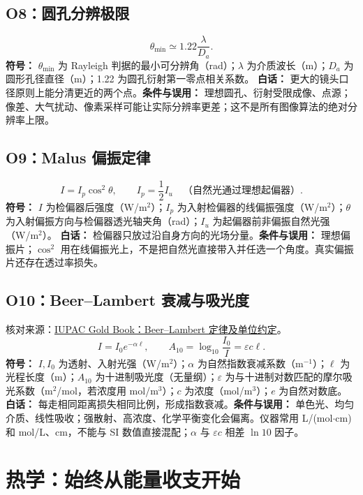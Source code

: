 \subsection{O8：圆孔分辨极限}
\begin{equation}
\theta_{\min}\simeq1.22\frac{\lambda}{D_a}.
\end{equation}
\textbf{符号：} $\theta_{\min}$ 为 Rayleigh 判据的最小可分辨角（rad）；$\lambda$ 为介质波长（m）；$D_a$ 为圆形孔径直径（m）；1.22 为圆孔衍射第一零点相关系数。
\textbf{白话：} 更大的镜头口径原则上能分清更近的两个点。\textbf{条件与误用：} 理想圆孔、衍射受限成像、点源；像差、大气扰动、像素采样可能让实际分辨率更差；这不是所有图像算法的绝对分辨率上限。

\subsection{O9：Malus 偏振定律}
\begin{equation}
I=I_p\cos^2\theta,\qquad I_p=\frac12I_u\quad\text{（自然光通过理想起偏器）}.
\end{equation}
\textbf{符号：} $I$ 为检偏器后强度（W/m$^2$）；$I_p$ 为入射检偏器的线偏振强度（W/m$^2$）；$\theta$ 为入射偏振方向与检偏器透光轴夹角（rad）；$I_u$ 为起偏器前非偏振自然光强（W/m$^2$）。
\textbf{白话：} 检偏器只放过沿自身方向的光场分量。\textbf{条件与误用：} 理想偏振片；$\cos^2$ 用在线偏振光上，不是把自然光直接带入并任选一个角度。真实偏振片还存在透过率损失。

\subsection{O10：Beer--Lambert 衰减与吸光度}
核对来源：\href{https://goldbook.iupac.org/terms/view/B00626}{IUPAC Gold Book：Beer--Lambert 定律及单位约定}。
\begin{equation}
I=I_0e^{-\alpha\ell},\qquad A_{10}=\log_{10}\frac{I_0}{I}=\varepsilon c\ell.
\end{equation}
\textbf{符号：} $I,I_0$ 为透射、入射光强（W/m$^2$）；$\alpha$ 为自然指数衰减系数（m$^{-1}$）；$\ell$ 为光程长度（m）；$A_{10}$ 为十进制吸光度（无量纲）；$\varepsilon$ 为与十进制对数匹配的摩尔吸光系数（m$^2$/mol，若浓度用 mol/m$^3$）；$c$ 为浓度（mol/m$^3$）；$e$ 为自然对数底。
\textbf{白话：} 每走相同距离损失相同比例，形成指数衰减。\textbf{条件与误用：} 单色光、均匀介质、线性吸收；强散射、高浓度、化学平衡变化会偏离。仪器常用 L/(mol$\cdot$cm) 和 mol/L、cm，不能与 SI 数值直接混配；$\alpha$ 与 $\varepsilon c$ 相差 $\ln10$ 因子。

\section{热学：始终从能量收支开始}
